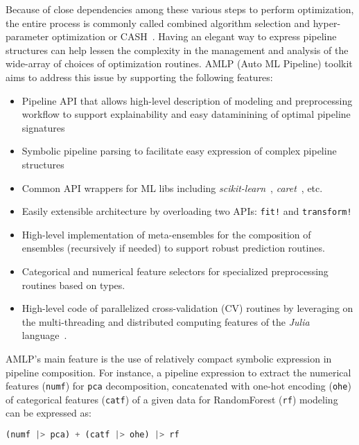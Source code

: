 \documentclass{juliacon}
\begin{document}
\vskip 6pt

Because of close dependencies among these various steps to perform
optimization, the entire process is commonly called combined algorithm
selection and hyper-parameter
optimization or CASH~\cite{feurer2015askl,Thornton:KDD2013}.  Having an elegant way to
express pipeline structures can help lessen the complexity in the management
and analysis of the wide-array of choices of optimization routines. AMLP (Auto
ML Pipeline) toolkit aims to address  this issue by supporting the following
features:
\begin{itemize}
\item Pipeline API that allows high-level description of modeling and 
      preprocessing workflow to support explainability and easy 
      dataminining of optimal pipeline signatures
\item Symbolic pipeline parsing to facilitate easy expression 
      of complex pipeline structures
\item Common API wrappers for ML libs including
      \emph{scikit-learn}~\cite{pedregosa2011},
      \emph{caret}~\cite{caret2008}, etc.
\item Easily extensible architecture by
      overloading two APIs: \texttt{fit!} and \texttt{transform!}
\item High-level implementation of meta-ensembles
      for the composition of ensembles (recursively if needed) to support robust prediction routines.
\item Categorical and numerical feature selectors
      for specialized preprocessing routines based on types.
\item High-level code of parallelized cross-validation (CV)
      routines by leveraging on the multi-threading and
      distributed computing features
      of the \emph{Julia} language~\cite{bezanson2017julia}.
\end{itemize}

AMLP's main feature is the use of relatively compact symbolic expression in
pipeline composition.  For instance, a pipeline expression to extract the
numerical features (\texttt{numf}) for 
\texttt{pca} decomposition, concatenated with one-hot
encoding (\texttt{ohe}) of categorical features (\texttt{catf})
of a given data for RandomForest (\texttt{rf}) modeling can be expressed
as:
\begin{lstlisting}[language=Julia,numbers=none]
   (numf |> pca) + (catf |> ohe) |> rf 
\end{lstlisting}

\vskip 6pt
\end{document}
